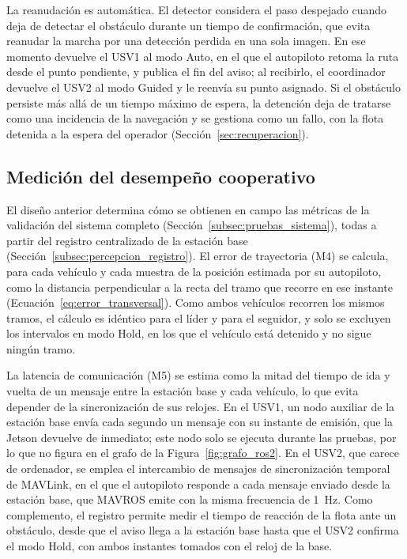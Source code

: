 La reanudación es automática. El detector considera el paso despejado cuando deja de detectar el obstáculo 
durante un tiempo de confirmación, que evita reanudar la marcha por una detección perdida en una sola imagen. 
En ese momento devuelve el USV1 al modo Auto, en el que el autopiloto retoma la ruta desde el punto pendiente, 
y publica el fin del aviso; al recibirlo, el coordinador devuelve el USV2 al modo Guided y le reenvía su punto 
asignado. Si el obstáculo persiste más allá de un tiempo máximo de espera, la detención deja de tratarse como 
una incidencia de la navegación y se gestiona como un fallo, con la flota detenida a la espera del operador 
(Sección~\ref{sec:recuperacion}).

\subsection{Medición del desempeño cooperativo}
\label{subsec:medicion_desempeno}

El diseño anterior determina cómo se obtienen en campo las métricas de la validación del sistema completo 
(Sección~\ref{subsec:pruebas_sistema}), todas a partir del registro centralizado de la estación base 
(Sección~\ref{subsec:percepcion_registro}). El error de trayectoria (M4) se calcula, para cada vehículo y cada muestra de la posición estimada por su 
autopiloto, como la distancia perpendicular a la recta del tramo que recorre en ese instante 
(Ecuación~\ref{eq:error_transversal}). Como ambos vehículos recorren los mismos tramos, el cálculo es idéntico para el líder y para el seguidor, y solo 
se excluyen los intervalos en modo Hold, en los que el vehículo está detenido y no sigue ningún tramo.

La latencia de comunicación (M5) se estima como la mitad del tiempo de ida y vuelta de un mensaje entre la 
estación base y cada vehículo, lo que evita depender de la sincronización de sus relojes. En el USV1, un nodo 
auxiliar de la estación base envía cada segundo un mensaje con su instante de emisión, que la Jetson devuelve 
de inmediato; este nodo solo se ejecuta durante las pruebas, por lo que no figura en el grafo de la 
Figura~\ref{fig:grafo_ros2}. En el USV2, que carece de ordenador, se emplea el intercambio de mensajes de 
sincronización temporal de MAVLink, en el que el autopiloto responde a cada mensaje enviado desde la estación base, 
que MAVROS emite con la misma frecuencia de 1~Hz. Como complemento, el registro permite medir el tiempo de 
reacción de la flota ante un obstáculo, desde 
que el aviso llega a la estación base hasta que el USV2 confirma el modo Hold, con ambos instantes tomados con 
el reloj de la base.

